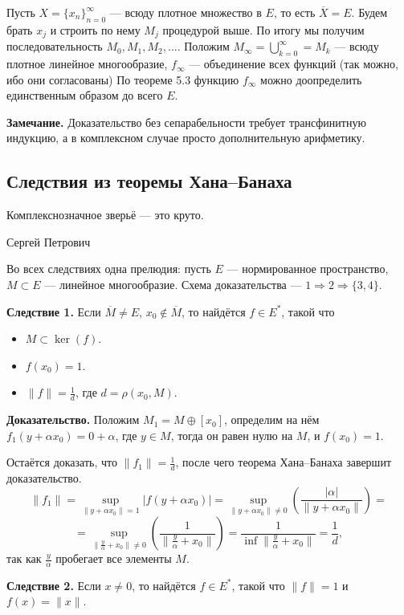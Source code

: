 Пусть $X = \{x_n\}_{n=0}^\infty$ --- всюду плотное множество в $E$, то есть $\overline X = E$.
Будем брать $x_j$ и строить по нему $M_j$ процедурой выше.
По итогу мы получим последовательность $M_0, M_1, M_2, \dots$.
Положим $M_\infty = \bigcup_{k=0}^\infty = M_k$ --- всюду плотное линейное многообразие, $f_\infty$ --- объединение всех функций (так можно, ибо они согласованы)
По теореме 5.3 функцию $f_\infty$ можно доопределить единственным образом до всего $E$.

\QED

\textbf{Замечание.} Доказательство без сепарабельности требует трансфинитную индукцию, а в комплексном случае просто дополнительную арифметику.

\subsection{Следствия из теоремы Хана--Банаха}
\epigraph{Комплекснозначное зверьё --- это круто.}{Сергей Петрович}

Во всех следствиях одна прелюдия: пусть $E$ --- нормированное пространство, $M \subset E$ --- линейное многообразие.
Схема доказательства --- $1 \Rightarrow 2 \Rightarrow \{3, 4\}$.

\textbf{Следствие 1.} Если $\overline M \ne E$, $x_0 \not \in \overline M$, то найдётся $f \in E^*$, такой что
\begin{itemize}
    \item $M \subset \ker(f)$.
    \item $f(x_0) = 1$.
    \item $\|f\| = \frac{1}{d}$, где $d = \rho(x_0, M)$.
\end{itemize}

\textbf{Доказательство.} Положим $M_1 = M \oplus [x_0]$, определим на нём $f_1(y + \alpha x_0) = 0 + \alpha$, где $y \in M$, тогда он равен нулю на $M$, и $f(x_0) = 1$.

Остаётся доказать, что $\|f_1\| = \frac{1}{d}$, после чего теорема Хана--Банаха завершит доказательство.
\[
    \|f_1\| = \sup_{\|y + \alpha x_0\| = 1} |f(y + \alpha x_0)| = \sup_{\|y + \alpha x_0\| \ne 0} \left( \frac{|\alpha|}{\|y + \alpha x_0\|} \right) =
\]
\[
    = \sup_{\|\frac{y}{\alpha} + x_0\| \ne 0} \left( \frac{1}{\|\frac{y}{\alpha} + x_0\|} \right) = \frac{1}{\inf \|\frac{y}{\alpha} + x_0\|} = \frac{1}{d},
\]
так как $\frac{y}{\alpha}$ пробегает все элементы $M$.

\QED

\textbf{Следствие 2.} Если $x \ne 0$, то найдётся $f \in E^*$, такой что $\|f\| = 1$ и $f(x) = \|x\|$.

